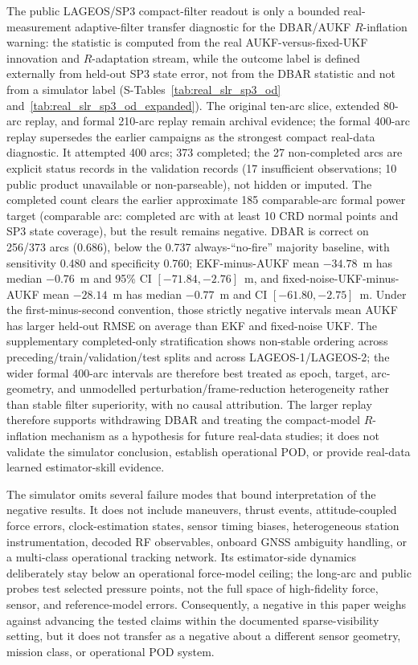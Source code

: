 \documentclass{article}
\begin{document}
The public LAGEOS/SP3 compact-filter readout is only a bounded real-measurement adaptive-filter transfer diagnostic for the DBAR/AUKF \(R\)-inflation warning: the statistic is computed from the real AUKF-versus-fixed-UKF innovation and \(R\)-adaptation stream, while the outcome label is defined externally from held-out SP3 state error, not from the DBAR statistic and not from a simulator label (S-Tables~\ref{tab:real_slr_sp3_od} and~\ref{tab:real_slr_sp3_od_expanded}). The original ten-arc slice, extended 80-arc replay, and formal 210-arc replay remain archival evidence; the formal 400-arc replay supersedes the earlier campaigns as the strongest compact real-data diagnostic. It attempted 400 arcs; 373 completed; the 27 non-completed arcs are explicit status records in the validation records (17 insufficient observations; 10 public product unavailable or non-parseable), not hidden or imputed. The completed count clears the earlier approximate 185 comparable-arc formal power target (comparable arc: completed arc with at least 10 CRD normal points and SP3 state coverage), but the result remains negative. DBAR is correct on 256/373 arcs (0.686), below the 0.737 always-``no-fire'' majority baseline, with sensitivity 0.480 and specificity 0.760; EKF-minus-AUKF mean $-34.78$~m has median $-0.76$~m and 95\% CI $[-71.84,-2.76]$~m, and fixed-noise-UKF-minus-AUKF mean $-28.14$~m has median $-0.77$~m and CI $[-61.80,-2.75]$~m. Under the first-minus-second convention, those strictly negative intervals mean AUKF has larger held-out RMSE on average than EKF and fixed-noise UKF. The supplementary completed-only stratification shows non-stable ordering across preceding/train/validation/test splits and across LAGEOS-1/LAGEOS-2; the wider formal 400-arc intervals are therefore best treated as epoch, target, arc-geometry, and unmodelled perturbation/frame-reduction heterogeneity rather than stable filter superiority, with no causal attribution. The larger replay therefore supports withdrawing DBAR and treating the compact-model \(R\)-inflation mechanism as a hypothesis for future real-data studies; it does not validate the simulator conclusion, establish operational POD, or provide real-data learned estimator-skill evidence.

The simulator omits several failure modes that bound interpretation of the negative results. It does not include maneuvers, thrust events, attitude-coupled force errors, clock-estimation states, sensor timing biases, heterogeneous station instrumentation, decoded RF observables, onboard GNSS ambiguity handling, or a multi-class operational tracking network. Its estimator-side dynamics deliberately stay below an operational force-model ceiling; the long-arc and public probes test selected pressure points, not the full space of high-fidelity force, sensor, and reference-model errors. Consequently, a negative in this paper weighs against advancing the tested claims within the documented sparse-visibility setting, but it does not transfer as a negative about a different sensor geometry, mission class, or operational POD system.
\end{document}
